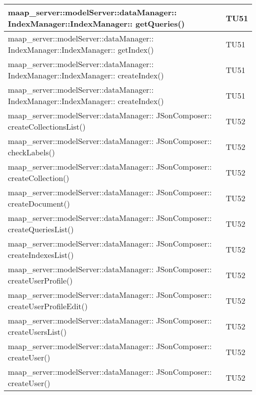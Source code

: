 \begin{center}
\begin{longtable}{|p{12cm}|p{2cm}|}
\midrule
maap\_server::modelServer::dataManager:: IndexManager::IndexManager:: getQueries() & TU51\\

\midrule
maap\_server::modelServer::dataManager:: IndexManager::IndexManager:: getIndex() & TU51\\

\midrule
maap\_server::modelServer::dataManager:: IndexManager::IndexManager:: createIndex() & TU51\\

\midrule
maap\_server::modelServer::dataManager:: IndexManager::IndexManager:: createIndex() & TU51\\

\midrule
maap\_server::modelServer::dataManager:: JSonComposer:: createCollectionsList() & TU52\\

\midrule
maap\_server::modelServer::dataManager:: JSonComposer:: checkLabels() & TU52\\

\midrule
maap\_server::modelServer::dataManager:: JSonComposer:: createCollection() & TU52\\

\midrule
maap\_server::modelServer::dataManager:: JSonComposer:: createDocument() & TU52\\

\midrule
maap\_server::modelServer::dataManager:: JSonComposer:: createQueriesList() & TU52\\

\midrule
maap\_server::modelServer::dataManager:: JSonComposer:: createIndexesList() & TU52\\

\midrule
maap\_server::modelServer::dataManager:: JSonComposer:: createUserProfile() & TU52\\

\midrule
maap\_server::modelServer::dataManager:: JSonComposer:: createUserProfileEdit() & TU52\\

\midrule
maap\_server::modelServer::dataManager:: JSonComposer:: createUsersList() & TU52\\

\midrule
maap\_server::modelServer::dataManager:: JSonComposer:: createUser() & TU52\\

\midrule
maap\_server::modelServer::dataManager:: JSonComposer:: createUser() & TU52\\


\end{longtable}
\end{center}
